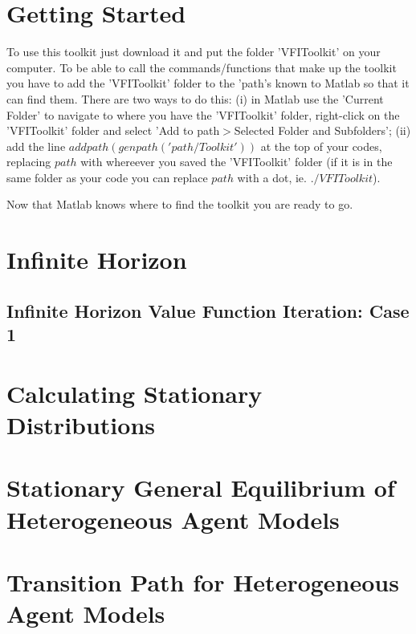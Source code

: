 \documentclass[11pt,fleqn]{article}
\begin{document}
\section{Getting Started} \label{sec:GettingStarted}
To use this toolkit just download it and put the folder 'VFIToolkit' on your computer. To be able to call the commands/functions that make up the toolkit you have to add the 'VFIToolkit' folder to the 'path's known to Matlab so that it can find them. There are two ways to do this: (i) in Matlab use the 'Current Folder' to navigate to where you have the 'VFIToolkit' folder, right-click on the 'VFIToolkit' folder and select 'Add to path$>$Selected Folder and Subfolders'; (ii) add the line $addpath(genpath('path/Toolkit'))$ at the top of your codes, replacing $path$ with whereever you saved the 'VFIToolkit' folder (if it is in the same folder as your code you can replace $path$ with a dot, ie. $./VFIToolkit$).

Now that Matlab knows where to find the toolkit you are ready to go. 

\section{Infinite Horizon}

\subsection{Infinite Horizon Value Function Iteration: Case 1} \label{sec:VFI_Case1}


% 

\section{Calculating Stationary Distributions}


\section{Stationary General Equilibrium of Heterogeneous Agent Models} \label{sec:BHAmodel_GE}


\section{Transition Path for Heterogeneous Agent Models}

\end{document}
